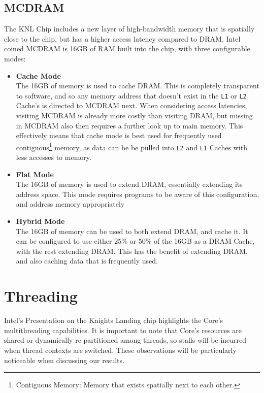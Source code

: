 \documentclass[bsc,frontabs,twoside,singlespacing,parskip,deptreport]{infthesis}     %
\begin{document}
\subsection{MCDRAM}
The KNL Chip includes a new layer of high-bandwidth memory that is spatially close to the chip, but has a higher access latency compared to DRAM. Intel coined MCDRAM is 16GB of RAM built into the chip, with three configurable modes:

\begin{itemize}
    \item \textbf{Cache Mode} \\
    The 16GB of memory is used to cache DRAM. This is completely transparent to software, and so any memory address that doesn't exist in the \texttt{L1} or \texttt{L2} Cache's is directed to MCDRAM next. When considering access latencies, visiting MCDRAM is already more costly than visiting DRAM, but missing in MCDRAM also then requires a further look up to main memory. This effectively means that cache mode is best used for frequently used contiguous\footnote{Contiguous Memory: Memory that exists spatially next to each other.} memory, as data can be be pulled into \texttt{L2} and \texttt{L1} Caches with less accesses to memory.
    
    \item \textbf{Flat Mode} \\
    The 16GB of memory is used to extend DRAM, essentially extending its address space. This mode requires programs to be aware of this configuration, and address memory appropriately
    
    \item \textbf{Hybrid Mode} \\
    The 16GB of memory can be used to both extend DRAM, and cache it. It can be configured to use either 25\% or 50\% of the 16GB as a DRAM Cache, with the rest extending DRAM. This has the benefit of extending DRAM, and also caching data that is frequently used.
\end{itemize}

\section{Threading}\label{knl-threading}
Intel's Presentation\cite{intel_pres} on the Knights Landing chip highlights the Core's multithreading capabilities. It is important to note that Core's resources are shared or dynamically re-partitioned among threads, so stalls will be incurred when thread contexts are switched. These observations will be particularly noticeable when discussing our results.
\end{document}
